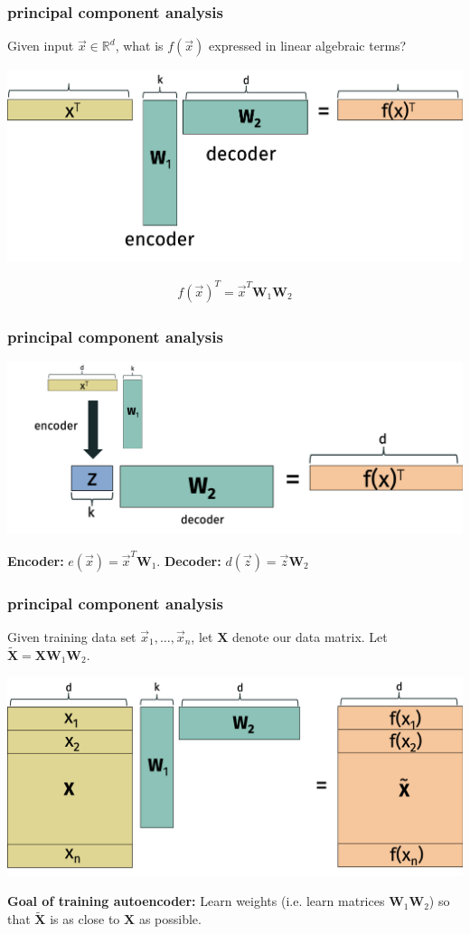 \documentclass[handout,compress]{beamer}
\newcommand{\bv}[1]{\mathbf{#1}}
\newcommand{\R}{\mathbb{R}}
\begin{document}
\begin{frame}
	\frametitle{principal component analysis}
	Given input $\vec{x}\in \R^d$, what is $f(\vec{x})$ expressed in linear algebraic terms?
		\begin{center}
		\includegraphics[width=.8\textwidth]{auto_alg.png}
	\end{center}
\begin{align*}
	f(\vec{x})^T = \vec{x}^T\bv{W}_1\bv{W}_2
\end{align*}
\end{frame}
\begin{frame}
	\frametitle{principal component analysis}
	\begin{center}
		\includegraphics[width=.8\textwidth]{enc_dec.png}
	\end{center}
	\begin{center}
		\textbf{Encoder:} $e(\vec{x}) = \vec{x}^T \bv{W}_1$. \hspace{2em} \textbf{Decoder:} $d(\vec{z}) = \vec{z}\bv{W}_2$
	\end{center}
\end{frame}

\begin{frame}
	\frametitle{principal component analysis}
	Given training data set $\vec{x}_1, \ldots, \vec{x}_n$, let $\bv{X}$ denote our data matrix. Let  $\tilde{\bv{X}} = \bv{X}\bv{W}_1\bv{W}_2$.
	\begin{center}
		\includegraphics[width=.8\textwidth]{auto_alg_agg.png}
	\end{center}
	\textbf{Goal of training autoencoder:} Learn weights (i.e. learn matrices $\bv{W}_1\bv{W}_2$) so that $\tilde{\bv{X}}$ is as close to $\bv{X}$ as possible. 
\end{frame}
\end{document}
